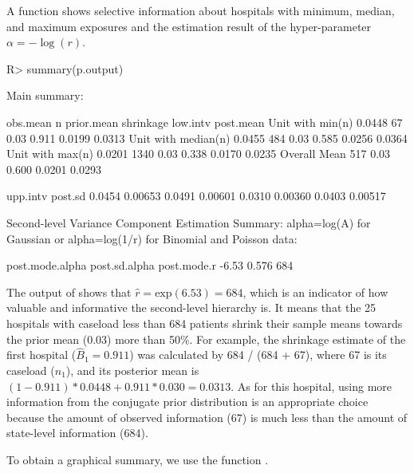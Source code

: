 \documentclass[article]{jss}
\begin{document}
A function  shows selective information about hospitals with minimum, median, and maximum exposures and the estimation result of the hyper-parameter $\alpha=-\log(r)$.  \begin{CodeChunk}
\begin{CodeInput}
R> summary(p.output)
\end{CodeInput}
\begin{CodeOutput}
Main summary:

                    obs.mean    n prior.mean shrinkage low.intv post.mean
Unit with min(n)      0.0448   67       0.03     0.911   0.0199    0.0313   
Unit with median(n)   0.0455  484       0.03     0.585   0.0256    0.0364   
Unit with max(n)      0.0201 1340       0.03     0.338   0.0170    0.0235   
Overall Mean                  517       0.03     0.600   0.0201    0.0293   

                    upp.intv  post.sd
                      0.0454  0.00653
                      0.0491  0.00601
                      0.0310  0.00360
                      0.0403  0.00517

Second-level Variance Component Estimation Summary:
alpha=log(A) for Gaussian or alpha=log(1/r) for Binomial and Poisson data:

post.mode.alpha post.sd.alpha post.mode.r
          -6.53         0.576         684
\end{CodeOutput}
\end{CodeChunk}
The output of  shows that $\hat{r}=\textrm{exp}(6.53)=684$, which is an indicator of how valuable and informative the second-level hierarchy is. It means that the 25 hospitals with caseload less than 684 patients shrink their sample means towards the prior mean (0.03) more than 50\%. For example, the shrinkage estimate of the first hospital ($\hat{B}_{1}= 0.911$) was calculated by 684 / (684 + 67), where 67 is its caseload ($n_{1}$), and its posterior mean is $(1-0.911)*0.0448 + 0.911 * 0.030=0.0313$. As for this hospital, using more information from the conjugate prior distribution is an appropriate choice because the amount  of observed information (67) is much less than the amount of state-level information (684).


To obtain a graphical summary, we use the function .%
\end{document}
